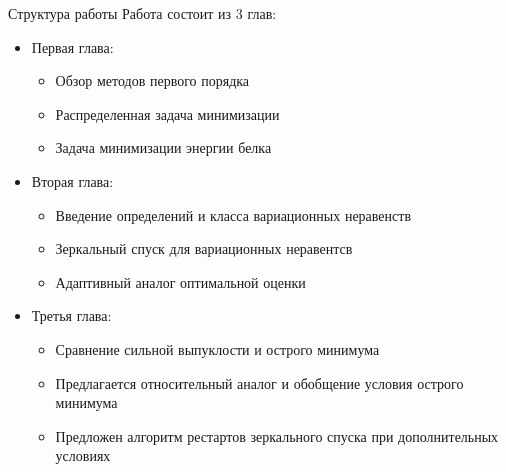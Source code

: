 \begin{frame}
    \setcounter{framenumber}{1}
    \maketitle
\end{frame}

\begin{frame}{Структура работы}
    Работа состоит из 3 глав:
    \begin{itemize}
        \item Первая глава: 
        \begin{itemize}
            \item Обзор методов первого порядка
            \item Распределенная задача минимизации 
            \item Задача минимизации энергии белка
        \end{itemize}
        \item Вторая глава:
        \begin{itemize}
            \item Введение определений и класса вариационных неравенств
            \item Зеркальный спуск для вариационных неравентсв
            \item Адаптивный аналог оптимальной оценки
        \end{itemize}
        \item Третья глава:
        \begin{itemize}
            \item Сравнение сильной выпуклости и острого минимума
            \item Предлагается относительный аналог и обобщение условия острого минимума
            \item Предложен алгоритм рестартов зеркального спуска при дополнительных условиях
        \end{itemize}
    \end{itemize}
\end{frame}
